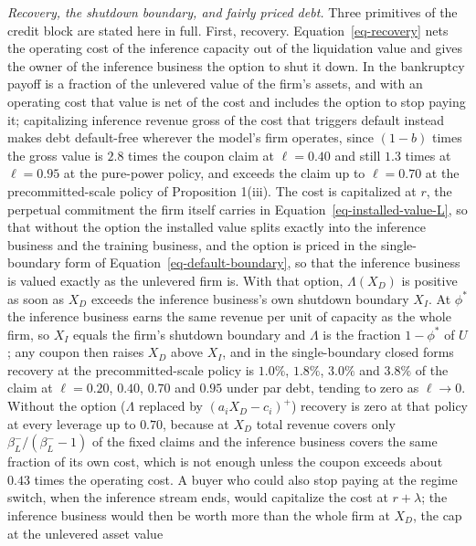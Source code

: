 \documentclass[
  11pt,
  letterpaper,
]{scrartcl}
\begin{document}
\emph{Recovery, the shutdown boundary, and fairly priced debt.} Three
primitives of the credit block are stated here in full. First, recovery.
Equation~\ref{eq-recovery} nets the operating cost of the inference
capacity out of the liquidation value and gives the owner of the
inference business the option to shut it down. In
\citet{leland1994corporate} the bankruptcy payoff is a fraction of the
unlevered value of the firm's assets, and with an operating cost that
value is net of the cost and includes the option to stop paying it;
capitalizing inference revenue gross of the cost that triggers default
instead makes debt default-free wherever the model's firm operates,
since \((1-b)\) times the gross value is \(2.8\) times the coupon claim
at \(\ell = 0.40\) and still \(1.3\) times at \(\ell = 0.95\) at the
pure-power policy, and exceeds the claim up to \(\ell = 0.70\) at the
precommitted-scale policy of Proposition 1(iii). The cost is capitalized
at \(r\), the perpetual commitment the firm itself carries in
Equation~\ref{eq-installed-value-L}, so that without the option the
installed value splits exactly into the inference business and the
training business, and the option is priced in the single-boundary form
of Equation~\ref{eq-default-boundary}, so that the inference business is
valued exactly as the unlevered firm is. With that option,
\(\Lambda(X_D)\) is positive as soon as \(X_D\) exceeds the inference
business's own shutdown boundary \(X_I\). At \(\phi^*\) the inference
business earns the same revenue per unit of capacity as the whole firm,
so \(X_I\) equals the firm's shutdown boundary and \(\Lambda\) is the
fraction \(1 - \phi^*\) of \(U\); any coupon then raises \(X_D\) above
\(X_I\), and in the single-boundary closed forms recovery at the
precommitted-scale policy is \(1.0\%\), \(1.8\%\), \(3.0\%\) and
\(3.8\%\) of the claim at \(\ell = 0.20\), \(0.40\), \(0.70\) and
\(0.95\) under par debt, tending to zero as \(\ell \to 0\). Without the
option (\(\Lambda\) replaced by \((a_i X_D - c_i)^+\)) recovery is zero
at that policy at every leverage up to \(0.70\), because at \(X_D\)
total revenue covers only \(\beta_L^-/(\beta_L^- - 1)\) of the fixed
claims and the inference business covers the same fraction of its own
cost, which is not enough unless the coupon exceeds about \(0.43\) times
the operating cost. A buyer who could also stop paying at the regime
switch, when the inference stream ends, would capitalize the cost at
\(r + \lambda\); the inference business would then be worth more than
the whole firm at \(X_D\), the cap at the unlevered asset value
\end{document}
